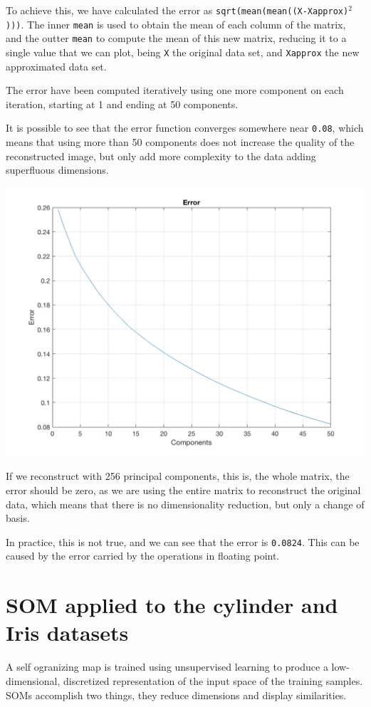 \documentclass[10pt]{article}
\begin{document}
\begin{multicols}{2}
  To achieve this, we have calculated the error as \texttt{sqrt(mean(mean((X-Xapprox)$^2$)))}.
  The inner \texttt{mean} is used to obtain the mean of each column of the matrix, and the
  outter \texttt{mean} to compute the mean of this new matrix, reducing it to a single value
  that we can plot, being \texttt{X} the original data set, and \texttt{Xapprox} the new
  approximated data set.

  The error have been computed iteratively using one more component on each iteration, starting
  at 1 and ending at 50 components.

  It is possible to see that the error function converges somewhere near \texttt{0.08},
  which means that using more than 50 components does not increase the quality of the
  reconstructed image, but only add more complexity to the data adding superfluous
  dimensions.

  \begin{center}
	\includegraphics[width=0.8\linewidth]{img/error}
  \end{center}

  If we reconstruct with 256 principal components, this is, the whole matrix, the error
  should be zero, as we are using the entire matrix to reconstruct the original data, which
  means that there is no dimensionality reduction, but only a change of basis.

  In practice, this is not true, and we can see that the error is \texttt{0.0824}. This can be
  caused by the error carried by the operations in floating point.

  
  
  \section*{SOM applied to the cylinder and Iris datasets}
  A self ogranizing map is trained using unsupervised learning to produce
  a low-dimensional, discretized representation of the input space of the
  training samples. SOMs accomplish two things, they reduce dimensions and
  display similarities.

\end{multicols}
\end{document}
